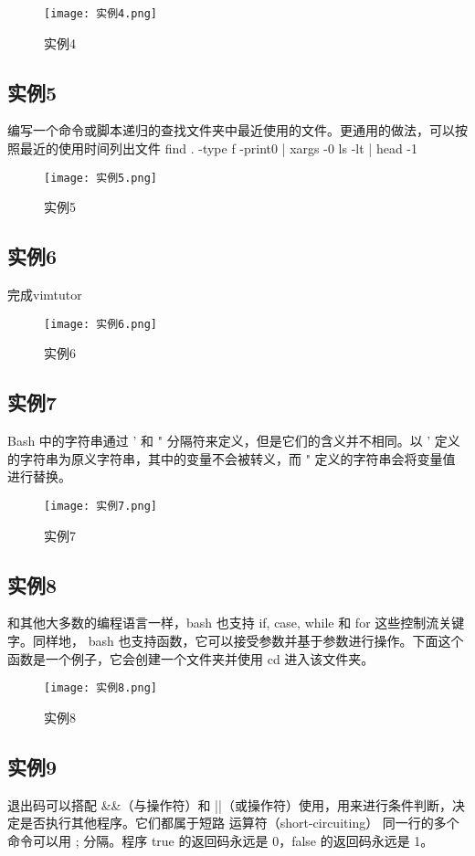 \documentclass[a4paper, 12pt]{article}
\begin{document}
\begin{figure}[h!]
  \centering
  \texttt{[image: 实例4.png]}
  \caption{实例4}
\end{figure}

\subsection{实例5}
编写一个命令或脚本递归的查找文件夹中最近使用的文件。更通用的做法，可以按照最近的使用时间列出文件 find . -type f -print0 | xargs -0 ls -lt | head -1

\begin{figure}[h!]
  \centering
  \texttt{[image: 实例5.png]}
  \caption{实例5}
\end{figure}

\subsection{实例6}
完成vimtutor

\begin{figure}[h!]
  \centering
  \texttt{[image: 实例6.png]}
  \caption{实例6}
\end{figure}

\subsection{实例7}
Bash 中的字符串通过 ' 和 " 分隔符来定义，但是它们的含义并不相同。以 ' 定义的字符串为原义字符串，其中的变量不会被转义，而 " 定义的字符串会将变量值进行替换。

\begin{figure}[h!]
  \centering
  \texttt{[image: 实例7.png]}
  \caption{实例7}
\end{figure}

\subsection{实例8}
和其他大多数的编程语言一样，bash 也支持 if, case, while 和 for 这些控制流关键字。同样地， bash 也支持函数，它可以接受参数并基于参数进行操作。下面这个函数是一个例子，它会创建一个文件夹并使用 cd 进入该文件夹。

\begin{figure}[h!]
  \centering
  \texttt{[image: 实例8.png]}
  \caption{实例8}
\end{figure}

\subsection{实例9}
退出码可以搭配 \&\&（与操作符）和 ||（或操作符）使用，用来进行条件判断，决定是否执行其他程序。它们都属于短路 运算符（short-circuiting） 同一行的多个命令可以用 ; 分隔。程序 true 的返回码永远是 0，false 的返回码永远是 1。
\end{document}
